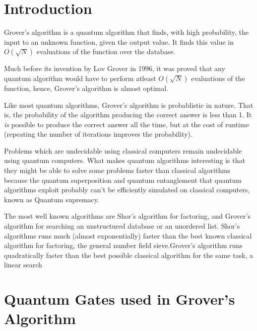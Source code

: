 \documentclass[a4paper]{article}
\begin{document}
\section{Introduction}

Grover's algorithm is a quantum algorithm that finds, with high probability,
the input to an unknown function, given the output value. It finds this value
in $ O(\sqrt{N}) $ evaluations of the function over the database.
\\
\par

Much before its invention by Lov Grover in 1996, it was proved that any quantum
algorithm would have to perform atleast $O(\sqrt{N})$ evaluations of the
function, hence, Grover's algorithm is almost optimal.
\\
\par
Like most quantum algorithms, Grover's algorithm is probablistic in nature.
That is, the probability of the algorithm producing the correct answer is less
than 1.  It \textit{is} possible to produce the correct answer all the time,
but at the cost of runtime (repeating the number of iterations improves the
probability).
\\
\par

Problems which are undecidable using classical computers remain undecidable
using quantum computers. What makes quantum algorithms interesting is
that they might be able to solve some problems faster than classical algorithms
because the quantum superposition and quantum entanglement that quantum
algorithms exploit probably can't be efficiently simulated on classical
computers, known as Quantum supremacy.
\\
\par

The most well known algorithms are Shor's algorithm for factoring, and Grover's
algorithm for searching an unstructured database or an unordered list. Shor's
algorithms runs much (almost exponentially) faster than the best known
classical algorithm for factoring, the general number field sieve.Grover's
algorithm runs quadratically faster than the best possible classical algorithm
for the same task, a linear search

\pagebreak


\section{Quantum Gates used in Grover's Algorithm}
\end{document}

